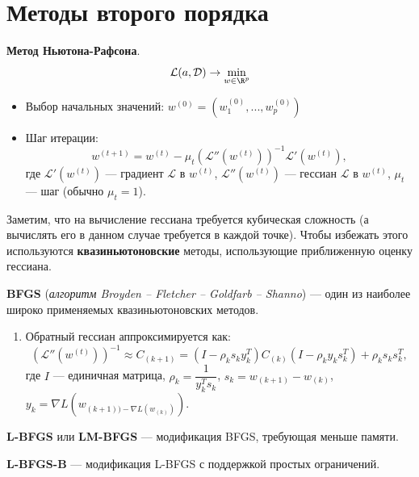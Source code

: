 \section{Методы второго порядка}

\begin{definition}
    \textbf{Метод Ньютона-Рафсона}.
    \[
        \mathcal{L}(a,\mathcal{D})\to\min_{w\in\R^p}
    \]
    \begin{itemize}
        \item Выбор начальных значений: $w^{(0)}=(w_1^{(0)},...,w_p^{(0)})$
        \item Шаг итерации:
        \[
            w^{(t+1)}=w^{(t)}-\mu_t\left(\mathcal{L}''(w^{(t)})\right)^{-1}\mathcal{L}'(w^{(t)}),
        \]
        где $\mathcal{L}'(w^{(t)})$ --- градиент $\mathcal{L}$ в $w^{(t)}$, $\mathcal{L}''(w^{(t)})$ --- гессиан $\mathcal{L}$ в $w^{(t)}$, $\mu_t$ --- шаг (обычно $\mu_t=1$).
    \end{itemize}
\end{definition}

Заметим, что на вычисление гессиана требуется кубическая сложность (а вычислять его в данном случае требуется в каждой точке). Чтобы избежать этого используются \textbf{квазиньютоновские} методы, использующие приближенную оценку гессиана.

\begin{definition}
    \textbf{BFGS} (\textit{алгоритм Broyden -- Fletcher -- Goldfarb -- Shanno}) --- один из наиболее широко применяемых квазиньютоновских методов.
    \begin{enumerate}
        \item Обратный гессиан аппроксимируется как:
        \[
            (\mathcal{L}''(w^{(t)}))^{-1}\approx C_{(k+1)}=(I-\rho_ks_ky_k^T)C_{(k)}(I-\rho_ky_ks_k^T)+\rho_ks_ks_k^T,
        \]
        где $I$ --- единичная матрица, $\rho_k=\dfrac{1}{y_k^Ts_k}$, $s_k=w_{(k+1)}-w_{(k)}$, $y_k=\nabla L(w_{(k+1))-\nabla L(w_{(k)})})$.
    \end{enumerate}
\end{definition}

\begin{definition}
    \textbf{L-BFGS} или \textbf{LM-BFGS} --- модификация BFGS, требующая меньше памяти.
\end{definition}

\begin{definition}
    \textbf{L-BFGS-B} --- модификация L-BFGS с поддержкой простых ограничений.
\end{definition}

